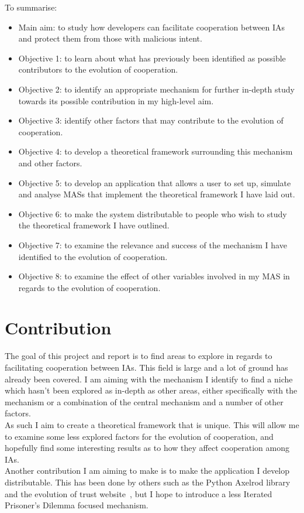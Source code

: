 \documentclass[]{final_report}
\begin{document}
To summarise:
\begin{itemize}
	\item Main aim: to study how developers can facilitate cooperation between IAs and protect them from those with malicious intent.
	\item Objective 1: to learn about what has previously been identified as possible contributors to the evolution of cooperation.
	\item Objective 2: to identify an appropriate mechanism for further in-depth study towards its possible contribution in my high-level aim.
	\item Objective 3: identify other factors that may contribute to the evolution of cooperation.
	\item Objective 4: to develop a theoretical framework surrounding this mechanism and other factors.
	\item Objective 5: to develop an application that allows a user to set up, simulate and analyse MASs that implement the theoretical framework I have laid out.
	\item Objective 6: to make the system distributable to people who wish to study the theoretical framework I have outlined.
	\item Objective 7: to examine the relevance and success of the mechanism I have identified to the evolution of cooperation.
	\item Objective 8: to examine the effect of other variables involved in my MAS in regards to the evolution of cooperation.
\end{itemize}

\section{Contribution}
The goal of this project and report is to find areas to explore in regards to facilitating cooperation between IAs. This field is large and a lot of ground has already been covered. I am aiming with the mechanism I identify to find a niche which hasn't been explored as in-depth as other areas, either specifically with the mechanism or a combination of the central mechanism and a number of other factors.\\
As such I aim to create a theoretical framework that is unique. This will allow me to examine some less explored factors for the evolution of cooperation, and hopefully find some interesting results as to how they affect cooperation among IAs.\\
Another contribution I am aiming to make is to make the application I develop distributable. This has been done by others such as the Python Axelrod library~\cite{axelrodproject} and the evolution of trust website~\cite{evol_trust}, but I hope to introduce a less Iterated Prisoner's Dilemma focused mechanism.
\end{document}
